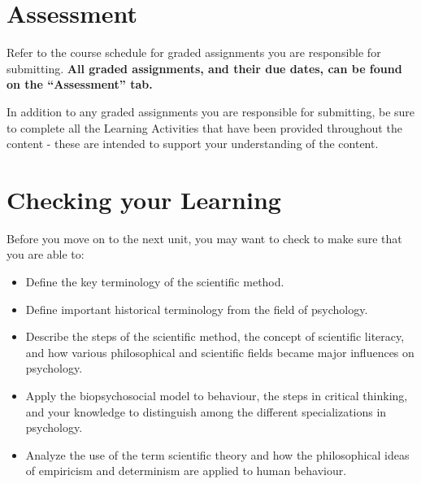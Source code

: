 \documentclass[
]{book}
\providecommand{\tightlist}{%
  \setlength{\itemsep}{0pt}\setlength{\parskip}{0pt}}
\begin{document}
\hypertarget{assessment}{%
\section*{Assessment}\label{assessment}}

\begin{assessment}
Refer to the course schedule for graded assignments you are responsible for submitting. \textbf{All graded assignments, and their due dates, can be found on the ``Assessment'' tab.}

In addition to any graded assignments you are responsible for submitting, be sure to complete all the Learning Activities that have been provided throughout the content - these are intended to support your understanding of the content.
\end{assessment}

\hypertarget{checking-your-learning}{%
\section*{Checking your Learning}\label{checking-your-learning}}

Before you move on to the next unit, you may want to check to make sure that you are able to:

\begin{progress}
\begin{itemize}
\tightlist
\item
  Define the key terminology of the scientific method.\\
\item
  Define important historical terminology from the field of psychology.\\
\item
  Describe the steps of the scientific method, the concept of scientific literacy, and how various philosophical and scientific fields became major influences on psychology.\\
\item
  Apply the biopsychosocial model to behaviour, the steps in critical thinking, and your knowledge to distinguish among the different specializations in psychology.\\
\item
  Analyze the use of the term scientific theory and how the philosophical ideas of empiricism and determinism are applied to human behaviour.
\end{itemize}
\end{progress}
\end{document}
